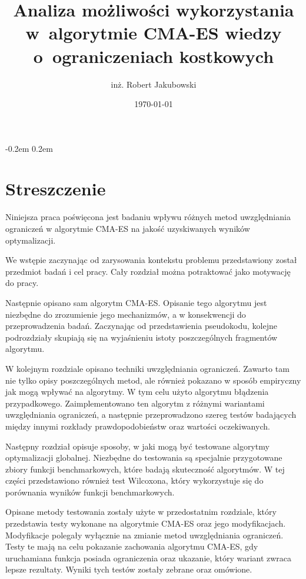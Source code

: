 \documentclass{mini}
\title{Analiza możliwości wykorzystania w~algorytmie CMA-ES wiedzy o~ograniczeniach kostkowych}
\author{inż. Robert Jakubowski}
\date{\today}
\begin{document}
\maketitle

\pagebreak
\thispagestyle{empty}

\openup -0.2em %
\tableofcontents
\openup 0.2em %

\thispagestyle{empty}
\raggedbottom
\pagebreak


\section{Streszczenie}

\hspace{3,4ex}Niniejsza praca poświęcona jest badaniu wpływu różnych metod uwzględniania ograniczeń w algorytmie CMA-ES na jakość uzyskiwanych wyników optymalizacji.

We wstępie zaczynając od zarysowania kontekstu problemu przedstawiony został przedmiot badań i cel pracy. Cały rozdział można potraktować jako motywację do pracy.

Następnie opisano sam algorytm CMA-ES. Opisanie tego algorytmu jest niezbędne do zrozumienie jego mechanizmów, a w konsekwencji do przeprowadzenia badań. Zaczynając od przedstawienia pseudokodu, kolejne podrozdziały skupiają się na wyjaśnieniu istoty poszczególnych fragmentów algorytmu. 

W kolejnym rozdziale opisano techniki uwzględniania ograniczeń. Zawarto tam nie tylko opisy poszczególnych metod, ale również pokazano w sposób empiryczny jak mogą wpływać na algorytmy. W tym celu użyto algorytmu błądzenia przypadkowego. Zaimplementowano ten algorytm z różnymi wariantami uwzględniania ograniczeń, a następnie przeprowadzono szereg testów badających między innymi rozkłady prawdopodobieństw oraz wartości oczekiwanych.

Następny rozdział opisuje sposoby, w jaki mogą być testowane algorytmy optymalizacji globalnej. Niezbędne do testowania są specjalnie przygotowane zbiory funkcji benchmarkowych, które badają skuteczność algorytmów. W tej części przedstawiono również test Wilcoxona, który wykorzystuje się do porównania wyników funkcji benchmarkowych.

Opisane metody testowania zostały użyte w przedostatnim rozdziale, który przedstawia testy wykonane na algorytmie CMA-ES oraz jego modyfikacjach. Modyfikacje polegały wyłącznie na zmianie metod uwzględniania ograniczeń. Testy te mają na celu pokazanie zachowania algorytmu CMA-ES, gdy uruchamiana funkcja posiada ograniczenia oraz ukazanie, który wariant zwraca lepsze rezultaty. Wyniki tych testów zostały zebrane oraz omówione.
\end{document}
